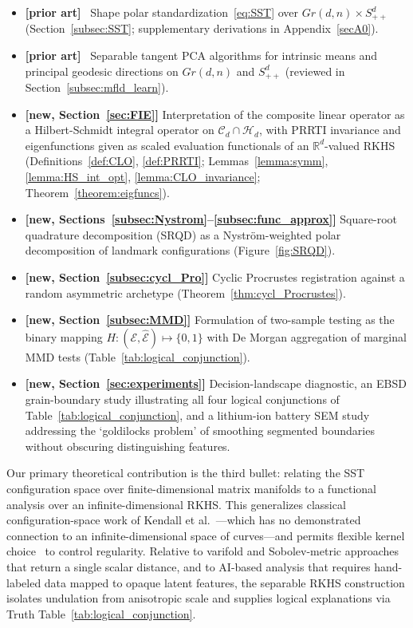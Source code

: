 \documentclass[pdflatex,iicol]{sn-jnl}%
\theoremstyle{thmstyleone}%
\theoremstyle{thmstyletwo}%
\theoremstyle{thmstylethree}%
\begin{document}
\begin{itemize}
    \item \textbf{[prior art]}~\cite{grey2023separable} Shape polar standardization~\eqref{eq:SST} over $Gr(d,n)\times S^d_{++}$ (Section~\ref{subsec:SST}; supplementary derivations in Appendix~\ref{secA0}).
    \item \textbf{[prior art]}~\cite{grey2023separable, fletcher2003statistics, fletcher2004principal, edelman1998geometry, bendokat2020grassmann} Separable tangent PCA algorithms for intrinsic means and principal geodesic directions on $Gr(d,n)$ and $S^d_{++}$ (reviewed in Section~\ref{subsec:mfld_learn}).
    \item \textbf{[new, Section~\ref{sec:FIE}]} Interpretation of the composite linear operator as a Hilbert-Schmidt integral operator on $\mathcal{C}_d\cap\mathcal{H}_d$, with PRRTI invariance and eigenfunctions given as scaled evaluation functionals of an $\mathbb{R}^d$-valued RKHS (Definitions~\ref{def:CLO}, \ref{def:PRRTI}; Lemmas~\ref{lemma:symm}, \ref{lemma:HS_int_opt}, \ref{lemma:CLO_invariance}; Theorem~\ref{theorem:eigfuncs}).
    \item \textbf{[new, Sections~\ref{subsec:Nystrom}--\ref{subsec:func_approx}]} Square-root quadrature decomposition (SRQD) as a Nystr\"om-weighted polar decomposition of landmark configurations (Figure~\ref{fig:SRQD}).
    \item \textbf{[new, Section~\ref{subsec:cycl_Pro}]} Cyclic Procrustes registration against a random asymmetric archetype (Theorem~\ref{thm:cycl_Procrustes}).
    \item \textbf{[new, Section~\ref{subsec:MMD}]} Formulation of two-sample testing as the binary mapping $H:(\mathcal{E},\widehat{\mathcal{E}})\mapsto\{0,1\}$ with De Morgan aggregation of marginal MMD tests (Table~\ref{tab:logical_conjunction}).
    \item \textbf{[new, Section~\ref{sec:experiments}]} Decision-landscape diagnostic, an EBSD grain-boundary study illustrating all four logical conjunctions of Table~\ref{tab:logical_conjunction}, and a lithium-ion battery SEM study addressing the `goldilocks problem' of smoothing segmented boundaries without obscuring distinguishing features.
\end{itemize}

Our primary theoretical contribution is the third bullet: relating the SST configuration space over finite-dimensional matrix manifolds to a functional analysis over an infinite-dimensional RKHS. This generalizes classical configuration-space work of Kendall et al.~\cite{kendall2009shape}---which has no demonstrated connection to an infinite-dimensional space of curves---and permits flexible kernel choice~\cite{micheli2013matrix} to control regularity. Relative to varifold and Sobolev-metric approaches~\cite{kaltenmark2017varifolds,pierson2022shape,bauer2017sobolev,hartman2023varigrad,hartman2021supervised} that return a single scalar distance, and to AI-based analysis that requires hand-labeled data mapped to opaque latent features, the separable RKHS construction isolates undulation from anisotropic scale and supplies logical explanations via Truth Table~\ref{tab:logical_conjunction}.
\end{document}
